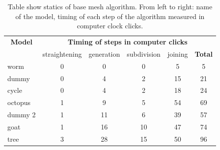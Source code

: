 \begin{table}[h]
\centering
\begin{tabular}{l|cccc||c}\hline
\multicolumn{1}{c}{\textbf{Model}} & \multicolumn{5}{c}{\textbf{Timing of steps in computer clicks}} \\
   & straightening & generation & subdivision & joining & \textbf{Total} \\ \hline
  worm & 0 & 0 & 0 & 5 & 5 \\
  dummy & 0 & 4 & 2 & 15 & 21 \\
  cycle & 0 & 4 & 2 & 18 & 24 \\
  octopus & 1 & 9 & 5 & 54 & 69 \\
  dummy 2 & 1 & 11 & 6 & 39 & 57 \\
  goat & 1 & 16 & 10 & 47 & 74 \\
  tree & 3 & 28 & 15 & 50 & 96 \\ \hline
\end{tabular}
\caption{Table show statics of base mesh algorithm. From left to right: name of the model, timing of each step of the algorithm measured in computer clock clicks.}
\label{tab:results}
\end{table}
